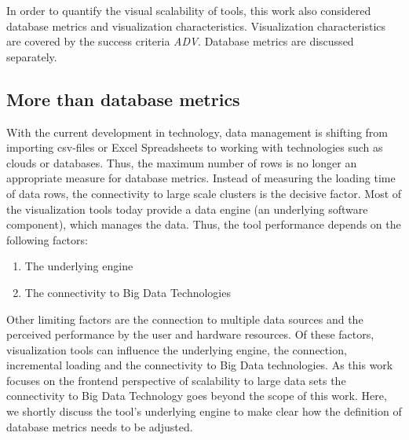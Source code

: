In order to quantify the visual scalability of tools, this work also considered database metrics and visualization characteristics. Visualization characteristics are covered by the success criteria \textit{ADV}. Database metrics are discussed separately. 

\subsection{More than database metrics}
With the current development in technology, data management is shifting from importing csv-files or Excel Spreadsheets to working with technologies such as clouds or databases. Thus, the maximum number of rows is no longer an appropriate measure for database metrics. Instead of measuring the loading time of data rows, the connectivity to large scale clusters is the decisive factor. Most of the visualization tools today provide a data engine (an underlying software component), which manages the data. Thus, the tool performance depends on the following factors:
\begin{enumerate}
    \item The underlying engine
    \item The connectivity to Big Data Technologies
\end{enumerate}
Other limiting factors are the connection to multiple data sources and the perceived performance by the user and hardware resources.  Of these factors, visualization tools can influence the underlying engine, the connection, incremental loading and the connectivity to Big Data technologies. As this work focuses on the frontend perspective of scalability to large data sets the connectivity to Big Data Technology goes beyond the scope of this work. Here, we shortly discuss the tool's underlying engine to make clear how the definition of database metrics needs to be adjusted. 

